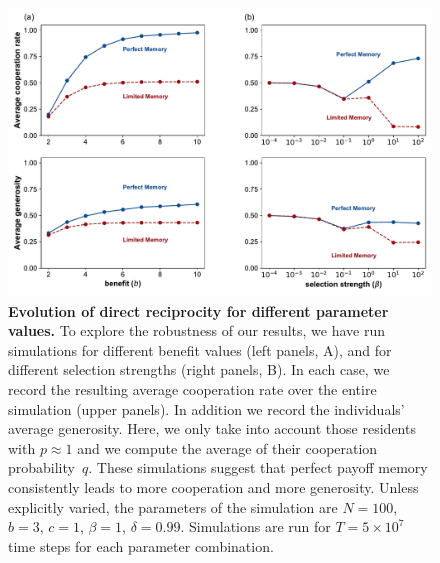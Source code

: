 \documentclass[11pt]{article}
\theoremstyle{plainCl1}
\theoremstyle{plainCl2}
\begin{document}
\clearpage
\newpage


\begin{figure}[t]
    \centering
    \includegraphics[width=.75\textwidth]{static/cooperation_rate_over_b_and_beta.pdf}
    \caption{{\bf Evolution of direct reciprocity for different parameter values.} 
    To explore the robustness of our results, we have run simulations for different benefit values (left panels, A), and for different selection strengths (right panels, B). 
    In each case, we record the resulting average cooperation rate over the entire simulation (upper panels). 
    In addition we record the individuals' average generosity. 
    Here, we only take into account those residents with $p\! \approx\! 1$ and we compute
    the average of their cooperation probability~$q$. 
    These simulations suggest that perfect payoff memory consistently leads to more cooperation and more generosity. 
    Unless explicitly varied, the parameters of the simulation are $N\!=\!100$, $b\!=\!3$, $c\!=\!1$, $\beta\!=\!1$, $\delta\!=\!0.99$. 
    Simulations are run for $T\!=\!5\times 10^7$ time steps for each parameter combination.}
    \label{fig:cooperation_rate_over_benefit_and_beta}
\end{figure}
\end{document}
